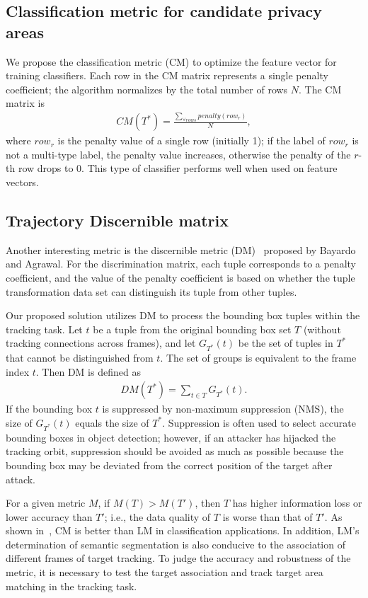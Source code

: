 \documentclass[trans]{IEEEtran}
\begin{document}
\subsection{Classification metric for candidate privacy areas}
We propose the classification metric (CM) to optimize the feature vector for training classifiers. Each row in the CM matrix represents a single penalty coefficient; the algorithm normalizes by the total number of rows $N$. The CM matrix is
\begin{eqnarray}\label{CMformula}
CM(T^*)=\frac{\sum_{\forall rows} penalty(row_r) }{N},
\end{eqnarray}
where $row_r$ is the penalty value of a single row (initially 1); if the label of $row_r$ is not a multi-type label, the penalty value increases, otherwise the penalty of the $r$-th row drops to 0. This type of classifier performs well when used on feature vectors.

\subsection{Trajectory Discernible matrix}
Another interesting metric is the discernible metric (DM)~\cite{bayardo2005data} proposed by Bayardo and Agrawal. For the discrimination matrix, each tuple corresponds to a penalty coefficient, and the value of the penalty coefficient is based on whether the tuple transformation data set can distinguish its tuple from other tuples. 

Our proposed solution utilizes DM to process the bounding box tuples within the tracking task. Let $t$ be a tuple from the original bounding box set $T$ (without tracking connections across frames), and let $G_{T^*}(t)$ be the set of tuples in $T^*$ that cannot be distinguished from $t$. The set of groups is equivalent to the frame index $t$. Then DM is defined as
\begin{eqnarray}\label{DMformula}
DM(T^*)=\sum_{t \in T} G_{T^*} (t).
\end{eqnarray}
If the bounding box $t$ is suppressed by non-maximum suppression (NMS), the size of $G_{T^*}(t)$ equals the size of $T^*$. Suppression is often used to select accurate bounding boxes in object detection; however, if an attacker has hijacked the tracking orbit, suppression should be avoided as much as possible because the bounding box may be deviated from the correct position of the target after attack.

For a given metric $M$, if $M(T)>M(T')$, then $T$ has higher information loss or lower accuracy than $T'$; i.e., the data quality of $T$ is worse than that of $T'$. As shown in~\cite{nergiz2007thoughts}, CM is better than LM in classification applications. In addition, LM's determination of semantic segmentation is also conducive to the association of different frames of target tracking. To judge the accuracy and robustness of the metric, it is necessary to test the target association and track target area matching in the tracking task.
\end{document}
